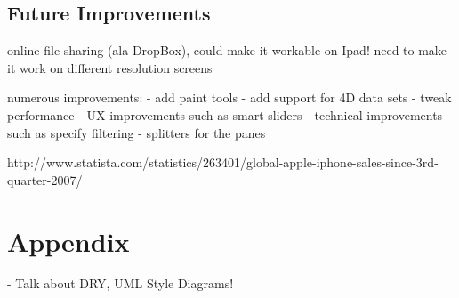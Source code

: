 \documentclass[a4paper,11pt,titlepage]{article}
\begin{document}
\subsection{Future Improvements}

online file sharing (ala DropBox), could make it workable on Ipad!
need to make it work on different resolution screens

numerous improvements:
- add paint tools
- add support for 4D data sets
- tweak performance
- UX improvements such as smart sliders
- technical improvements such as specify filtering
- splitters for the panes











\newpage

\begin{thebibliography}{1}


http://www.statista.com/statistics/263401/global-apple-iphone-sales-since-3rd-quarter-2007/

\end{thebibliography}

\newpage

\section{Appendix}



- Talk about DRY, UML Style Diagrams!
\end{document}
